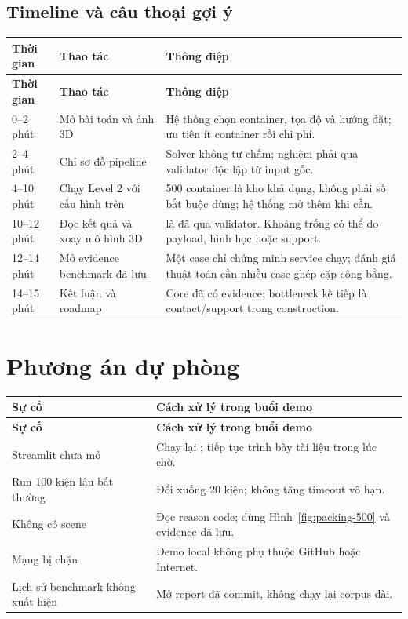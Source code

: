 \documentclass[12pt,a4paper]{article}
\newcommand{\code}[1]{\texttt{\detokenize{#1}}}
\begin{document}
\subsection{Timeline và câu thoại gợi ý}
\begin{longtable}{p{}p{}p{}}
\toprule
\textbf{Thời gian} & \textbf{Thao tác} & \textbf{Thông điệp} \\
\midrule
\endfirsthead
\toprule
\textbf{Thời gian} & \textbf{Thao tác} & \textbf{Thông điệp} \\
\midrule
\endhead
0--2 phút & Mở bài toán và ảnh 3D
& Hệ thống chọn container, tọa độ và hướng đặt; ưu tiên ít container rồi chi phí. \\
2--4 phút & Chỉ sơ đồ pipeline
& Solver không tự chấm; nghiệm phải qua validator độc lập từ input gốc. \\
4--10 phút & Chạy Level 2 với cấu hình trên
& 500 container là kho khả dụng, không phải số bắt buộc dùng; hệ thống mở thêm khi cần. \\
10--12 phút & Đọc kết quả và xoay mô hình 3D
& \code{VALID} là đã qua validator. Khoảng trống có thể do payload, hình học hoặc support. \\
12--14 phút & Mở evidence benchmark đã lưu
& Một case chỉ chứng minh service chạy; đánh giá thuật toán cần nhiều case ghép cặp công bằng. \\
14--15 phút & Kết luận và roadmap
& Core đã có evidence; bottleneck kế tiếp là contact/support trong construction. \\
\bottomrule
\end{longtable}

\section{Phương án dự phòng}

\begin{longtable}{p{}p{}}
\toprule
\textbf{Sự cố} & \textbf{Cách xử lý trong buổi demo} \\
\midrule
\endfirsthead
\toprule
\textbf{Sự cố} & \textbf{Cách xử lý trong buổi demo} \\
\midrule
\endhead
Streamlit chưa mở & Chạy lại \code{scripts/run_web_app.py}; tiếp tục trình bày tài liệu trong lúc chờ. \\
Run 100 kiện lâu bất thường & Đổi xuống 20 kiện; không tăng timeout vô hạn. \\
Không có scene & Đọc reason code; dùng Hình~\ref{fig:packing-500} và evidence đã lưu. \\
Mạng bị chặn & Demo local không phụ thuộc GitHub hoặc Internet. \\
Lịch sử benchmark không xuất hiện & Mở report đã commit, không chạy lại corpus dài. \\
\bottomrule
\end{longtable}
\end{document}
